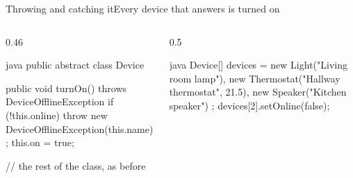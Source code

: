 \documentclass[\deckoptions]{beamer}
\begin{document}
\begin{frame}[fragile]{Throwing and catching it}{Every device that answers is turned on}
  \begin{columns}[T, onlytextwidth]
    \begin{column}{0.46\textwidth}
\begin{codeblock}[steps={2|4|none|none}, packed, marks={2/1, 4/2}]{java}
public abstract class Device {
    public void turnOn() throws DeviceOfflineException {
        if (!this.online) {
            throw new DeviceOfflineException(this.name);
        }
        this.on = true;
    }

    // the rest of the class, as before
}
\end{codeblock}
      \notesgap
      \begin{codenotes}[2]
      \end{codenotes}
    \end{column}
    \begin{column}{0.5\textwidth}
\begin{codeblock}[steps={none|none|9-11|12-14}, packed, marks={9-11/3, 12-14/4}, marks from=3]{java}
Device[] devices = {
        new Light("Living room lamp"),
        new Thermostat("Hallway thermostat", 21.5),
        new Speaker("Kitchen speaker")
};
devices[2].setOnline(false);


\end{codeblock}
\end{column}
\end{columns}
\end{frame}
\end{document}
